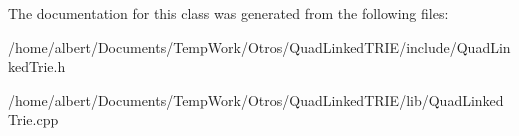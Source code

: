 The documentation for this class was generated from the following files\-:\begin{DoxyCompactItemize}
\item 
/home/albert/\-Documents/\-Temp\-Work/\-Otros/\-Quad\-Linked\-T\-R\-I\-E/include/Quad\-Linked\-Trie.\-h\item 
/home/albert/\-Documents/\-Temp\-Work/\-Otros/\-Quad\-Linked\-T\-R\-I\-E/lib/Quad\-Linked\-Trie.\-cpp\end{DoxyCompactItemize}
